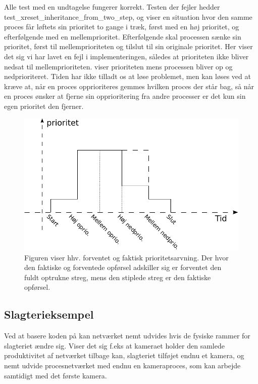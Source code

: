  Alle test med en undtagelse fungerer korrekt. Testen der fejler  hedder test\_xreset\_inheritance\_from\_two\_step, og viser en situation hvor den samme proces får løftets sin prioritet to gange i træk, først med en høj prioritet, og efterfølgende med en mellemprioritet. Efterfølgende skal processen sænke sin prioritet, først til  mellemprioriteten og tilslut til sin originale prioritet. Her viser det sig vi har lavet en fejl i implementeringen, således at prioriteten ikke bliver nedsat til mellemprioriteten.  viser prioriteten mens processen bliver op og nedprioriteret. Tiden har ikke tilladt os at løse problemet, men  kan løses ved at kræve at, når en proces opprioriteres gemmes hvilken proces der står bag, så når en proces ønsker at fjerne sin opprioritering fra andre processer er det kun sin egen  prioritet den fjerner.  
 
  
\begin{figure}
 \begin{center}
  \includegraphics[scale=1]{images/priority-inheritance}
	\caption{Figuren viser hhv. forventet og faktisk prioritetsarvning. Der hvor den faktiske og forventede opførsel adskiller sig er forventet den fuldt optrukne streg, mens den stiplede streg er den faktiske opførsel.}
	\label{fig:priority-inheritance}
\end{center}
\end{figure}
  

\subsection{Slagterieksempel}

Ved at basere koden på \pycsp kan netværket nemt udvides hvis de fysiske rammer for slagteriet ændre sig. Viser det sig f.eks at kameraet holder den samlede produktivitet af netværket tilbage kan, slagteriet tilføjet endnu et kamera, og nemt udvide procesnetværket med endnu en kameraproces, som kan arbejde samtidigt med det første kamera. 

